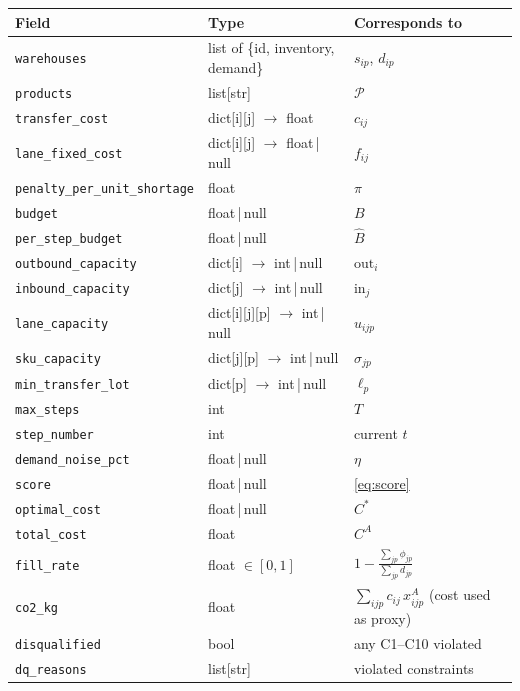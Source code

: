 \documentclass[11pt, a4paper]{article}
\begin{document}
\vspace{4pt}
\begin{tabular}{@{}lll@{}}
\toprule
\textbf{Field} & \textbf{Type} & \textbf{Corresponds to} \\
\midrule
\texttt{warehouses}              & list of \{id, inventory, demand\} &
  $s_{ip}$, $d_{ip}$ \\
\texttt{products}                & list[str] & $\mathcal{P}$ \\
\texttt{transfer\_cost}          & dict[i][j] $\to$ float & $c_{ij}$ \\
\texttt{lane\_fixed\_cost}       & dict[i][j] $\to$ float\,|\,null & $f_{ij}$ \\
\texttt{penalty\_per\_unit\_shortage} & float & $\pi$ \\
\texttt{budget}                  & float\,|\,null & $B$ \\
\texttt{per\_step\_budget}       & float\,|\,null & $\hat{B}$ \\
\texttt{outbound\_capacity}      & dict[i] $\to$ int\,|\,null & $\text{out}_i$ \\
\texttt{inbound\_capacity}       & dict[j] $\to$ int\,|\,null & $\text{in}_j$ \\
\texttt{lane\_capacity}          & dict[i][j][p] $\to$ int\,|\,null & $u_{ijp}$ \\
\texttt{sku\_capacity}           & dict[j][p] $\to$ int\,|\,null & $\sigma_{jp}$ \\
\texttt{min\_transfer\_lot}      & dict[p] $\to$ int\,|\,null & $\ell_p$ \\
\texttt{max\_steps}              & int & $T$ \\
\texttt{step\_number}            & int & current $t$ \\
\texttt{demand\_noise\_pct}      & float\,|\,null & $\eta$ \\
\midrule
\texttt{score}                   & float\,|\,null & \eqref{eq:score} \\
\texttt{optimal\_cost}           & float\,|\,null & $C^*$ \\
\texttt{total\_cost}             & float & $C^A$ \\
\texttt{fill\_rate}              & float $\in[0,1]$ &
  $1 - \frac{\sum_{jp}\phi_{jp}}{\sum_{jp}d_{jp}}$ \\
\texttt{co2\_kg}                 & float &
  $\sum_{ijp} c_{ij}\, x_{ijp}^A$
  (cost used as proxy) \\
\texttt{disqualified}            & bool & any C1--C10 violated \\
\texttt{dq\_reasons}             & list[str] & violated constraints \\
\bottomrule
\end{tabular}
\end{document}
